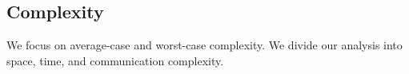 





\subsection{Complexity}

We focus on average-case and worst-case complexity. We divide our
analysis into space, time, and communication complexity.


